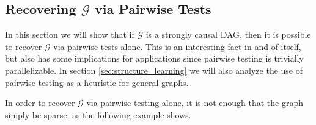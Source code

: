 \documentclass[12pt]{article}
\def\gcg{\mathcal{G}}  %
\newcommand{\pa}[1]{pa(#1)}  %
\begin{document}







\subsection{Recovering $\gcg$ via Pairwise Tests}
\label{sec:pairwise_algorithm}
In this section we will show that if $\gcg$ is a strongly causal DAG,
then it is possible to recover $\gcg$ via pairwise tests alone.  This
is an interesting fact in and of itself, but also has some
implications for applications since pairwise testing is trivially
parallelizable.  In section \ref{sec:structure_learning} we will also
analyze the use of pairwise testing as a heuristic for general graphs.

In order to recover $\gcg$ via pairwise testing alone, it is not
enough that the graph simply be sparse, as the following example
shows.
\end{document}
